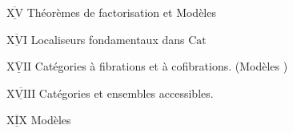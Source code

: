 $\overline{\underline{\mathrm{XV}}}$ Théorèmes de factorisation et Modèles 

$\overline{\underline{\mathrm{XVI}}}$ \;Localiseurs fondamentaux dans $\mathrm{Cat}$

$\overline{\underline{\mathrm{XVII}}}$ Catégories à fibrations et à cofibrations. (Modèles )

$\overline{\underline{\mathrm{XVIII}}}$ Catégories et ensembles accessibles.

$\overline{\underline{\mathrm{XIX}}}$ Modèles 



